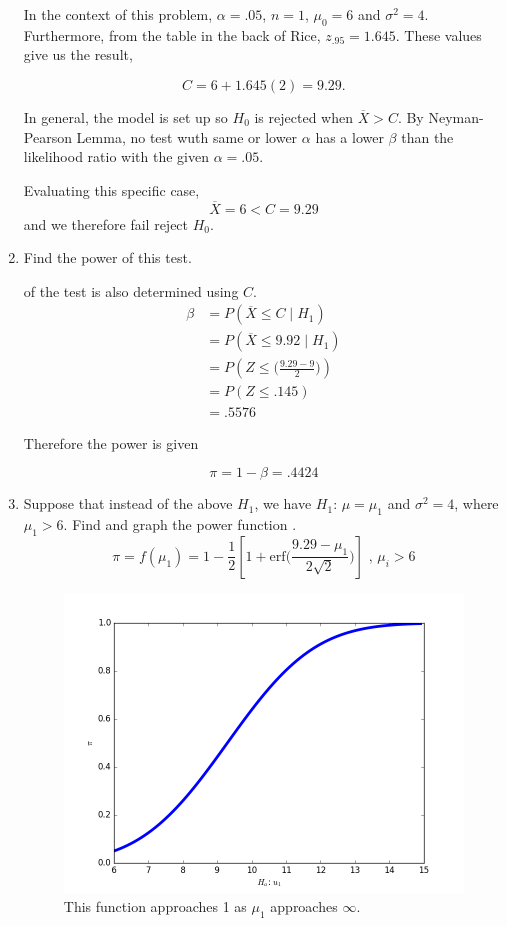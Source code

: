 \documentclass{tufte-book}
\newcommand{\erf}{\mathrm{erf}}
\theoremstyle{mytheoremstyle}
\theoremstyle{mylemstyle}
\theoremstyle{mydefstyle}
\begin{document}
\begin{enumerate}
In the context of this problem, $\alpha=.05$, $n=1$, $\mu_0=6$ and $\sigma^2=4$.  Furthermore, from the table in the back of Rice, $z_{.95} = 1.645$.  These values give us the result,

\[ C = 6 + 1.645(2) = 9.29. \]

In general, the model is set up so $H_0$ is rejected when $\overline{X} > C$.  By Neyman-Pearson Lemma, no test wuth same or lower $\alpha$ has a lower $\beta$ than the likelihood ratio with the given $\alpha=.05$.

Evaluating this specific case,
\[ \overline{X} = 6 < C = 9.29 \]
and we therefore fail reject $H_0$.

\item Find the power of this test.

 of the test is also determined using $C$.
\begin{align*}
\beta &= P(\overline{X} \leq C \mid H_1)\\
&= P(\overline{X} \leq 9.92 \mid H_1)\\
&= P(Z \leq\Big(\frac{9.29 - 9}{2}\Big))\\
&= P(Z \leq .145)\\
&= .5576
\end{align*}

Therefore the power is given

\[ \pi = 1- \beta = .4424 \]

\item Suppose that instead of the above $H_1$, we have $H_1$: $\mu=\mu_1$ and $\sigma^2=4$, where $\mu_1 > 6$.  Find and graph the power function \marginnote{$\Phi (\frac{x-\mu}{\sigma}) = \frac{1}{2}[1+ \erf(\frac{x-\mu}{\sigma\sqrt{2}})]$}.
\[ \pi = f(\mu_1) = 1 - \frac{1}{2}[1 + \erf\Big(\frac{9.29-\mu_1}{2\sqrt{2}}\Big)] \text{ , } \mu_i > 6 \]

\begin{figure}
\includegraphics{power}
\caption{This function approaches 1 as $\mu_1$ approaches $\infty$.}
\end{figure}
\end{enumerate}
\end{document}
